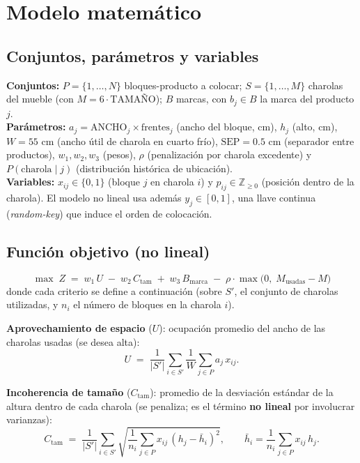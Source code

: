 \documentclass[11pt,letterpaper]{article}
\begin{document}
\section{Modelo matem\'atico}
\subsection{Conjuntos, par\'ametros y variables}
\textbf{Conjuntos:} $P=\{1,\dots,N\}$ bloques-producto a colocar; $S=\{1,\dots,M\}$
charolas del mueble (con $M=6\cdot\text{TAMA\~NO}$); $B$ marcas, con $b_j\in B$ la
marca del producto $j$.\\[0.2em]
\textbf{Par\'ametros:} $a_j=\text{ANCHO}_j\times\text{frentes}_j$ (ancho del bloque,
cm), $h_j$ (alto, cm), $W=55$ cm (ancho \'util de charola en cuarto fr\'io),
$\text{SEP}=0.5$ cm (separador entre productos), $w_1,w_2,w_3$ (pesos),
$\rho$ (penalizaci\'on por charola excedente) y
$P(\text{charola}\mid j)$ (distribuci\'on hist\'orica de ubicaci\'on).\\[0.2em]
\textbf{Variables:} $x_{ij}\in\{0,1\}$ (bloque $j$ en charola $i$) y
$p_{ij}\in\mathbb{Z}_{\ge0}$ (posici\'on dentro de la charola). El modelo no lineal
usa adem\'as $y_j\in[0,1]$, una llave continua (\emph{random-key}) que induce el
orden de colocaci\'on.

\subsection{Funci\'on objetivo (no lineal)}
\begin{equation}
\max\; Z \;=\; w_1\,U \;-\; w_2\,C_{\text{tam}} \;+\; w_3\,B_{\text{marca}}
\;-\; \rho\cdot\max\!\bigl(0,\; M_{\text{usadas}}-M\bigr)
\label{eq:obj}
\end{equation}
donde cada criterio se define a continuaci\'on (sobre $S'$, el conjunto de charolas
utilizadas, y $n_i$ el n\'umero de bloques en la charola $i$).

\noindent\textbf{Aprovechamiento de espacio} ($U$): ocupaci\'on promedio del ancho
de las charolas usadas (se desea alta):
\begin{equation}
U \;=\; \frac{1}{|S'|}\sum_{i\in S'}\frac{1}{W}\sum_{j\in P} a_j\,x_{ij}.
\label{eq:util}
\end{equation}

\noindent\textbf{Incoherencia de tama\~no} ($C_{\text{tam}}$): promedio de la
desviaci\'on est\'andar de la altura dentro de cada charola (se penaliza; es el
t\'ermino \textbf{no lineal} por involucrar varianzas):
\begin{equation}
C_{\text{tam}} \;=\; \frac{1}{|S'|}\sum_{i\in S'}
\sqrt{\frac{1}{n_i}\sum_{j\in P} x_{ij}\,(h_j-\bar h_i)^2},
\qquad \bar h_i=\frac{1}{n_i}\sum_{j\in P} x_{ij}\,h_j.
\label{eq:incoh}
\end{equation}
\end{document}

